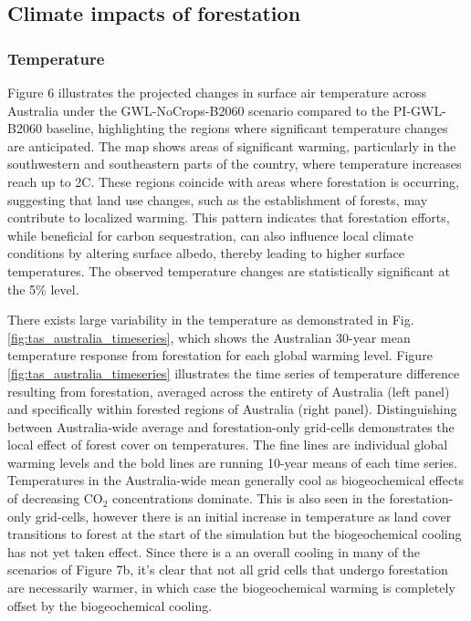 \documentclass[]{article}
\begin{document}
\subsection{Climate impacts of forestation}

\subsubsection{Temperature}

Figure 6 illustrates the projected changes in surface air temperature across Australia under the GWL-NoCrops-B2060 scenario compared to the PI-GWL-B2060 baseline, highlighting the regions where significant temperature changes are anticipated.
The map shows areas of significant warming, particularly in the southwestern and southeastern parts of the country, where temperature increases reach up to 2\textdegree{}C.
These regions coincide with areas where forestation is occurring, suggesting that land use changes, such as the establishment of forests, may contribute to localized warming.
This pattern indicates that forestation efforts, while beneficial for carbon sequestration, can also influence local climate conditions by altering surface albedo, thereby leading to higher surface temperatures.
The observed temperature changes are statistically significant at the 5\% level.

There exists large variability in the temperature as demonstrated in Fig. \ref{fig:tas_australia_timeseries}, which shows the Australian 30-year mean temperature response from forestation for each global warming level.
Figure \ref{fig:tas_australia_timeseries} illustrates the time series of temperature difference resulting from forestation, averaged across the entirety of Australia (left panel) and specifically within forested regions of Australia (right panel).
Distinguishing between Australia-wide average and forestation-only grid-cells demonstrates the local effect of forest cover on temperatures.
The fine lines are individual global warming levels and the bold lines are running 10-year means of each time series.
Temperatures in the Australia-wide mean generally cool as biogeochemical effects of decreasing CO$_2$ concentrations dominate.
This is also seen in the forestation-only grid-cells, however there is an initial increase in temperature as land cover transitions to forest at the start of the simulation but the biogeochemical cooling has not yet taken effect.
Since there is a an overall cooling in many of the scenarios of Figure 7b, it's clear that not all grid cells that undergo forestation are necessarily warmer, in which case the biogeochemical warming is completely offset by the biogeochemical cooling.
\end{document}
